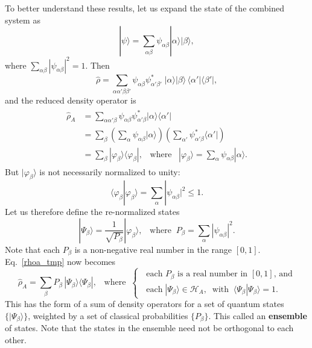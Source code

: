 \documentclass[prx,12pt]{revtex4-2}
\begin{document}
To better understand these results, let us expand the state of the
combined system as
\begin{equation}
  |\psi\rangle = \sum_{\alpha\beta} \psi_{\alpha\beta} |\alpha\rangle |\beta\rangle,
\end{equation}
where $\sum_{\alpha\beta} |\psi_{\alpha\beta}|^2 = 1$.  Then
\begin{equation}
  \hat{\rho} = \sum_{\alpha\alpha'\beta\beta'} \psi_{\alpha\beta}
  \psi_{\alpha'\beta'}^* \; |\alpha\rangle |\beta\rangle \,
  \langle\alpha'|\langle \beta'|,
\end{equation}
and the reduced density operator is
\begin{align}
  \begin{aligned}
    \hat{\rho}_A &= \sum_{\alpha\alpha'\beta} \psi_{\alpha\beta}\psi_{\alpha'\beta}^* |\alpha\rangle
    \langle\alpha'| \\
    &= \sum_\beta \left(\sum_\alpha \psi_{\alpha\beta} |\alpha\rangle\right)
    \left(\sum_{\alpha'} \psi_{\alpha'\beta}^*\langle\alpha'|\right) \\
    &= \sum_\beta |\varphi_\beta\rangle \langle \varphi_\beta|,
    \;\;\;\mathrm{where}\;\;\;
    |\varphi_\beta\rangle = \sum_\alpha \psi_{\alpha\beta} |\alpha\rangle.
  \end{aligned}
  \label{rhoa_tmp}
\end{align}
But $|\varphi_\beta\rangle$ is not necessarily normalized to unity:
\begin{equation}
  \langle \varphi_\beta | \varphi_\beta\rangle =
  \sum_{\alpha}|\psi_{\alpha\beta}|^2 \le 1.
\end{equation}
Let us therefore define the re-normalized states
\begin{equation}
  |\Psi_\beta\rangle = \frac{1}{\sqrt{P_\beta}} |\varphi_\beta\rangle,
  \;\;\;\mathrm{where} \;\; P_\beta = \sum_{\alpha}|\psi_{\alpha\beta}|^2.
\end{equation}
Note that each $P_\beta$ is a non-negative real number in the range
$[0,1]$.  Eq.~\eqref{rhoa_tmp} now becomes
\begin{equation}
  \hat{\rho}_A = \sum_\beta P_\beta\, |\Psi_\beta\rangle
  \langle \Psi_\beta|,
  \;\;\;\mathrm{where}\;\;
  \begin{cases}
    \;\;\textrm{each $P_\beta$ is a real number in $[0,1]$, and} \\
    \;\;\textrm{each}\; |\Psi_\beta\rangle \in \mathscr{H}_A,
    \;\;\mathrm{with}
    \;\;\langle\Psi_\beta|\Psi_\beta\rangle = 1.
  \end{cases}
  \label{rhoform}
\end{equation}
This has the form of a sum of density operators for a set of quantum
states $\{|\Psi_\beta\rangle\}$, weighted by a set of classical
probabilities $\{P_\beta\}$.  This called an \textbf{ensemble} of
states.  Note that the states in the ensemble need not be orthogonal
to each other.
\end{document}
